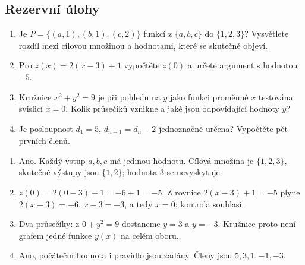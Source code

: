 \documentclass[11pt,a4paper]{article}
\begin{document}
\subsection*{Rezervní úlohy}
\begin{zadaniReseniBox}
\begin{enumerate}[label=\alph*)]
\item Je $P=\{(a,1),(b,1),(c,2)\}$ funkcí z $\{a,b,c\}$ do $\{1,2,3\}$? Vysvětlete rozdíl mezi cílovou množinou a hodnotami, které se skutečně objeví.
\item Pro $z(x)=2(x-3)+1$ vypočtěte $z(0)$ a určete argument s hodnotou $-5$.
\item Kružnice $x^2+y^2=9$ je při pohledu na $y$ jako funkci proměnné $x$ testována svislicí $x=0$. Kolik průsečíků vznikne a jaké jsou odpovídající hodnoty $y$?
\item Je posloupnost $d_1=5$, $d_{n+1}=d_n-2$ jednoznačně určena? Vypočtěte pět prvních členů.
\end{enumerate}
\tcblower
\begin{enumerate}[label=\alph*)]
\item Ano. Každý vstup $a,b,c$ má jedinou hodnotu. Cílová množina je $\{1,2,3\}$, skutečné výstupy jsou $\{1,2\}$; hodnota $3$ se nevyskytuje.
\item $z(0)=2(0-3)+1=-6+1=-5$. Z rovnice $2(x-3)+1=-5$ plyne $2(x-3)=-6$, $x-3=-3$, a tedy $x=0$; kontrola souhlasí.
\item Dva průsečíky: z $0+y^2=9$ dostaneme $y=3$ a $y=-3$. Kružnice proto není grafem jedné funkce $y(x)$ na celém oboru.
\item Ano, počáteční hodnota i pravidlo jsou zadány. Členy jsou $5,3,1,-1,-3$.
\end{enumerate}
\end{zadaniReseniBox}
\end{document}
